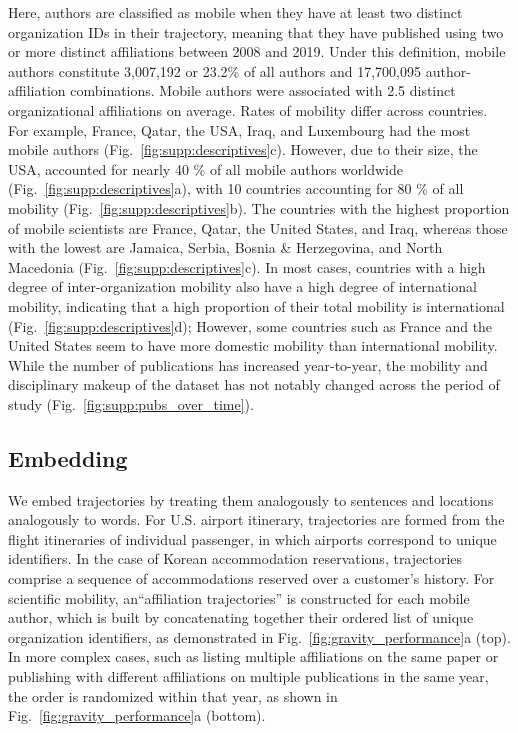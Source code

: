 \documentclass[12pt]{article} %
\begin{document}
Here, authors are classified as mobile when they have at least two distinct organization IDs in their trajectory, meaning that they have published using two or more distinct affiliations between 2008 and 2019.
Under this definition, mobile authors constitute 3,007,192 or 23.2\% of all authors and 17,700,095 author-affiliation combinations.
Mobile authors were associated with 2.5 distinct organizational affiliations on average.
Rates of mobility differ across countries.
For example, France, Qatar, the USA, Iraq, and Luxembourg had the most mobile authors (Fig.~\ref{fig:supp:descriptives}c).
However, due to their size, the USA, accounted for nearly 40 \% of all mobile authors worldwide (Fig.~\ref{fig:supp:descriptives}a), with 10 countries accounting for 80 \% of all mobility (Fig.~\ref{fig:supp:descriptives}b).
The countries with the highest proportion of mobile scientists are France, Qatar, the United States, and Iraq, whereas those with the lowest are Jamaica, Serbia, Bosnia \& Herzegovina, and North Macedonia (Fig.~\ref{fig:supp:descriptives}c).
In most cases, countries with a high degree of inter-organization mobility also have a high degree of international mobility, indicating that a high proportion of their total mobility is international (Fig.~\ref{fig:supp:descriptives}d);
However, some countries such as France and the United States seem to have more domestic mobility than international mobility.
While the number of publications has increased year-to-year, the mobility and disciplinary makeup of the dataset has not notably changed across the period of study (Fig.~\ref{fig:supp:pubs_over_time}).


\subsection*{Embedding}

We embed trajectories by treating them analogously to sentences and locations analogously to words.
For U.S. airport itinerary, trajectories are formed from the flight itineraries of individual passenger, in which airports correspond to unique identifiers.
In the case of Korean accommodation reservations, trajectories comprise a sequence of accommodations reserved over a customer's history.
For scientific mobility, an``affiliation trajectories'' is constructed for each mobile author, which is built by concatenating together their ordered list of unique organization identifiers, as demonstrated in Fig.~\ref{fig:gravity_performance}a (top).
In more complex cases, such as listing multiple affiliations on the same paper or publishing with different affiliations on multiple publications in the same year, the order is randomized within that year, as shown in Fig.~\ref{fig:gravity_performance}a (bottom).
\end{document}
